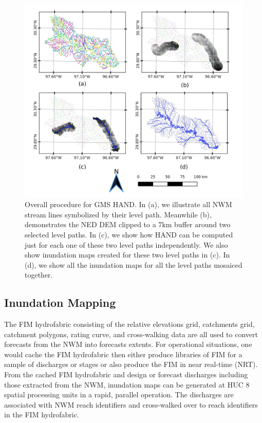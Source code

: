 \begin{figure}[h!]
\centering
\includegraphics[scale=1.0]{figures/gms_methods.jpg}
\caption{Overall procedure for GMS HAND.
In (a), we illustrate all NWM stream lines symbolized by their level path.
Meanwhile (b), demonstrates the NED DEM clipped to a 7km buffer around two selected level paths.
In (c), we show how HAND can be computed just for each one of these two level paths independently. 
We also show inundation maps created for these two level paths in (c). 
In (d), we show all the inundation maps for all the level paths mosaiced together. }
\label{fig:gms_methods}
\end{figure}
%
\subsection{Inundation Mapping}
\label{ssec:inundation_mapping}
%
The FIM hydrofabric consisting of the relative elevations grid, catchments grid, catchment polygons, rating curve, and cross-walking data are all used to convert forecasts from the NWM into forecasts extents.
For operational situations, one would cache the FIM hydrofabric then either produce libraries of FIM for a sample of discharges or stages or also produce the FIM in near real-time (NRT).
From the cached FIM hydrofabric and design or forecast discharges including those extracted from the NWM, inundation maps can be generated at HUC 8 spatial processing units in a rapid, parallel operation. 
The discharges are associated with NWM reach identifiers and cross-walked over to reach identifiers in the FIM hydrofabric.


